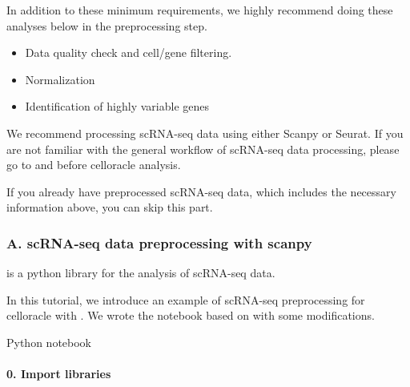 \documentclass[letterpaper,10pt,english]{sphinxmanual}
\begin{document}
In addition to these minimum requirements, we highly recommend doing these analyses below in the preprocessing step.
\begin{itemize}
\item {} 
Data quality check and cell/gene filtering.

\item {} 
Normalization

\item {} 
Identification of highly variable genes

\end{itemize}

We recommend processing scRNA-seq data using either Scanpy or Seurat.
If you are not familiar with the general workflow of scRNA-seq data processing, please go to  and  before celloracle analysis.

If you already have preprocessed scRNA-seq data, which includes the necessary information above, you can skip this part.


\subsubsection{A. scRNA-seq data preprocessing with scanpy}
\label{\detokenize{tutorials/scrnaprocess:a-scrna-seq-data-preprocessing-with-scanpy}}
 is a python library for the analysis of scRNA-seq data.

In this tutorial, we introduce an example of scRNA-seq preprocessing for celloracle with .
We wrote the notebook based on  with some modifications.

Python notebook


\paragraph{0. Import libraries}
\label{\detokenize{notebooks/03_scRNA-seq_data_preprocessing/scanpy_preprocessing_with_Paul_etal_2015_data:0.-Import-libraries}}\label{\detokenize{notebooks/03_scRNA-seq_data_preprocessing/scanpy_preprocessing_with_Paul_etal_2015_data::doc}}
{
\begin{sphinxVerbatim}[commandchars=\\\{\}]
\llap{\color{nbsphinxin}[1]:\,\hspace{\fboxrule}\hspace{\fboxsep}} 
   
   
   
   
\end{sphinxVerbatim}
}
\end{document}
